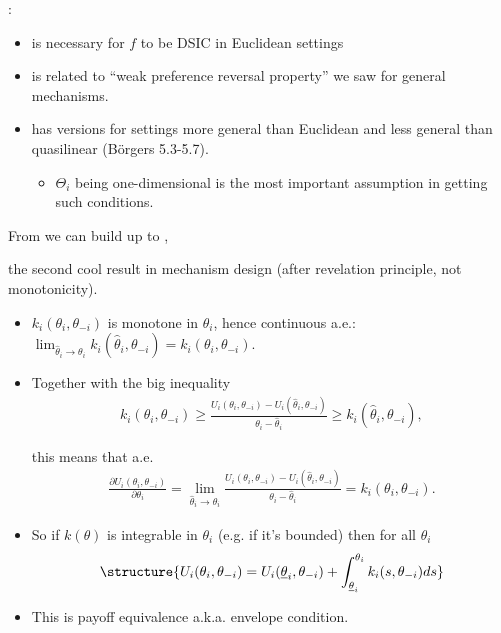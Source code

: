 \documentclass[english]{beamer}		%
\def\lyxframeend{} %
\begin{document}
:
\begin{itemize}
	\item is necessary for $f$ to be DSIC in Euclidean settings
	\item is related to ``weak preference reversal property'' we saw for general mechanisms.
	\item has versions for settings more general than Euclidean and less general than quasilinear (B{\"o}rgers 5.3-5.7).
	\begin{itemize}
		\item $\Theta_i$ being one-dimensional is the most important assumption in getting such conditions.
	\end{itemize}
\end{itemize}
From  we can build up to , 

the second cool result in mechanism design (after revelation principle, not monotonicity).
\lyxframeend


\begin{itemize}
	\item $k_i(\theta_i,\theta_{-i})$ is monotone in $\theta_i$, hence continuous a.e.: $\lim_{\hat{\theta}_i \to \theta_i} k_i(\hat{\theta}_i,\theta_{-i}) = k_i(\theta_i,\theta_{-i})$.
	\pause
	\item Together with the big inequality 
	{\small \vspace{-0.5em}\begin{align*}
		k_i(\theta_i,\theta_{-i})
		\geq 
		\frac{ U_i(\theta_i, \theta_{-i}) - U_i(\hat{\theta}_i, \theta_{-i}) }{ \theta_i - \hat{\theta}_i } 
		\geq 
		k_i(\hat{\theta}_i,\theta_{-i}),
	\end{align*}\vspace{-1em}}
	
	this means that a.e.
	\pause
	\vspace{-0.5em}\begin{align*}
		\frac{\partial U_i(\theta_i,\theta_{-i})}{\partial \theta_i} = \lim_{\hat{\theta}_i \to \theta_i} \frac{ U_i(\theta_i, \theta_{-i}) - U_i(\hat{\theta}_i, \theta_{-i}) }{ \theta_i - \hat{\theta}_i }  = k_i(\theta_i,\theta_{-i}).
	\end{align*}\vspace{-1em}
\end{itemize}
\lyxframeend


\begin{itemize}
	\item So if $k(\theta)$ is integrable in $\theta_i$ (e.g. if it's bounded) then for all $\theta_i$
	\vspace{-0.5em}\begin{align*}
		\structure{
		U_i(\theta_i, \theta_{-i}) = U_i (\underline{\theta}_i,\theta_{-i}) + \int_{\underline{\theta}_i}^{\theta_i} k_i(s,\theta_{-i}) d s
		}
	\end{align*}\vspace{-1em}
	\item This is \alert{payoff equivalence} a.k.a. envelope condition.
\end{itemize}
\lyxframeend
\end{document}
